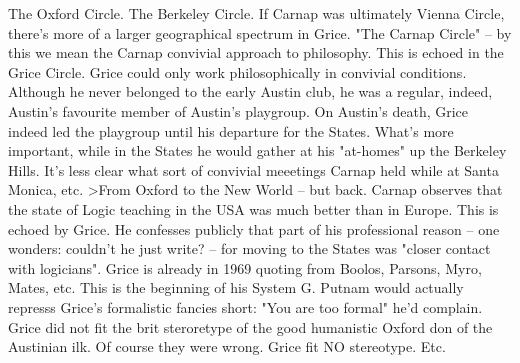 \documentclass[10pt,titlepage]{book}
\begin{document}
{The Oxford Circle. The Berkeley Circle. If Carnap was ultimately Vienna 
Circle,  there’s more of a larger geographical spectrum in Grice. "The Carnap 
Circle" --  by this we mean the Carnap convivial approach to philosophy. 
This is echoed in  the Grice Circle. Grice could only work philosophically in 
convivial conditions.  Although he never belonged to the early Austin club, 
he was a regular, indeed,  Austin's favourite member of Austin's playgroup. 
On Austin's death, Grice indeed  led the playgroup until his departure for 
the States. What's more important,  while in the States he would gather at his 
"at-homes" up the Berkeley Hills.  It's less clear what sort of convivial 
meeetings Carnap held while at Santa  Monica, etc. 
>From  Oxford to the New World – but back. Carnap  observes that the state 
of Logic teaching in  the USA was much better than  in Europe. This is echoed 
by Grice. He confesses publicly that part of his  professional reason -- 
one wonders:  couldn't he just write? -- for moving  to the States was "closer 
contact 
with  logicians". Grice is already in  1969 quoting from Boolos, Parsons, 
Myro, Mates, etc.  This is the beginning  of his System G. Putnam would 
actually represss Grice's formalistic fancies  short: "You are too formal" he'd 
complain. Grice did not fit  the brit  steroretype of the good humanistic 
Oxford don of the 
Austinian ilk. Of   course they were wrong. Grice fit NO stereotype. Etc.

}
\end{document}
